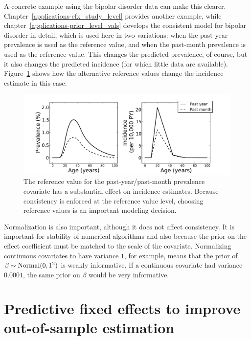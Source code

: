 A concrete example using the bipolar disorder data can make this
clearer.  Chapter~\ref{applications-efx_study_level} provides another
example, while chapter~\ref{applications-prior_level_vals} develops
the consistent model for bipolar disorder in detail, which is used
here in two variations: when the past-year prevalence is used
as the reference value, and when the past-month prevalence is
used as the reference value.  This changes the predicted prevalence, of
course, but it also changes the predicted incidence (for which little
data are available).  Figure~\ref{bipolar-ref-alts} shows how the
alternative reference values change the incidence estimate in this
case.


\begin{figure}[h]
\begin{center}
\includegraphics[width=\textwidth]{bipolar-ref-alts.pdf}
\caption[Comparison of reference value choice on incidence estimates.]{The 
  reference value for the past-year/past-month prevalence
  covariate has a substantial effect on incidence estimates.  Because
  consistency is enforced at the reference value level, choosing reference
  values is an important modeling decision.}
\label{bipolar-ref-alts}
\end{center}
\end{figure}


Normalization is also important, although it does not affect
consistency.  It is important for stability of numerical algorithms
and also because the prior on the effect coefficient must be matched
to the scale of the covariate.  Normalizing continuous covariates to
have variance $1$, for example, means that the prior of
$\beta\sim\operatorname{Normal}(0,1^2)$ is weakly informative.  If a continuous
covariate had variance $0.0001$, the same prior on $\beta$ would be
very informative.

\section{Predictive fixed effects to improve out-of-sample estimation}

